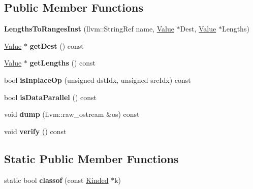 \subsection*{Public Member Functions}
\begin{DoxyCompactItemize}
\item 
\mbox{\label{classglow_1_1_lengths_to_ranges_inst_a2500225a220f1a9563cb59794b034e9d}} 
{\bfseries Lengths\+To\+Ranges\+Inst} (llvm\+::\+String\+Ref name, \hyperlink{classglow_1_1_value}{Value} $\ast$Dest, \hyperlink{classglow_1_1_value}{Value} $\ast$Lengths)
\item 
\mbox{\label{classglow_1_1_lengths_to_ranges_inst_a1a6599809fed9b19212b420286e55d46}} 
\hyperlink{classglow_1_1_value}{Value} $\ast$ {\bfseries get\+Dest} () const
\item 
\mbox{\label{classglow_1_1_lengths_to_ranges_inst_a9bc55403401881d87797755e1038effb}} 
\hyperlink{classglow_1_1_value}{Value} $\ast$ {\bfseries get\+Lengths} () const
\item 
\mbox{\label{classglow_1_1_lengths_to_ranges_inst_a8a0f6d6400a22b148c7de72221befe88}} 
bool {\bfseries is\+Inplace\+Op} (unsigned dst\+Idx, unsigned src\+Idx) const
\item 
\mbox{\label{classglow_1_1_lengths_to_ranges_inst_aaa343014bfb3456fb7f5bcb871cf9829}} 
bool {\bfseries is\+Data\+Parallel} () const
\item 
\mbox{\label{classglow_1_1_lengths_to_ranges_inst_a380d33b67b3049089ccf838df278a0b3}} 
void {\bfseries dump} (llvm\+::raw\+\_\+ostream \&os) const
\item 
\mbox{\label{classglow_1_1_lengths_to_ranges_inst_aded35234f047d64880c58315d81b7896}} 
void {\bfseries verify} () const
\end{DoxyCompactItemize}
\subsection*{Static Public Member Functions}
\begin{DoxyCompactItemize}
\item 
\mbox{\label{classglow_1_1_lengths_to_ranges_inst_a07ab7c6c14d922beefd57ab501d6518f}} 
static bool {\bfseries classof} (const \hyperlink{classglow_1_1_kinded}{Kinded} $\ast$k)
\end{DoxyCompactItemize}

